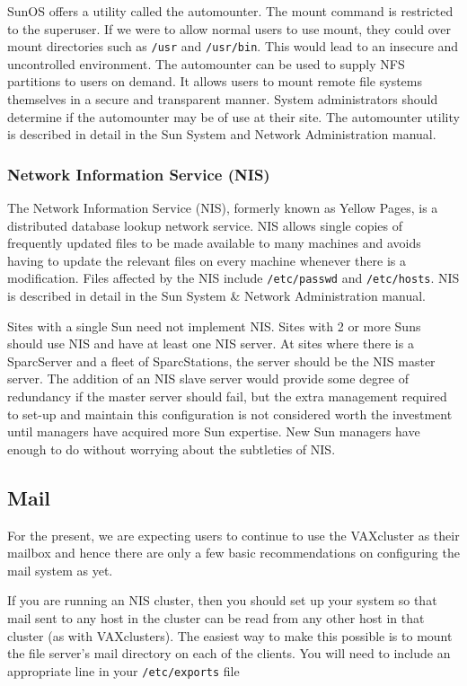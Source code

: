 SunOS offers a utility called the automounter. The mount command is restricted
to the superuser. If we were to allow normal users to use mount, they could
over mount directories such as {\tt /usr} and {\tt /usr/bin}. This would lead to an
insecure and uncontrolled environment. The automounter can be used to supply
NFS partitions to users on demand. It allows users to mount remote file
systems themselves in a secure and transparent manner. System administrators
should determine if the automounter may be of use at their site. The
automounter utility is described in detail in the Sun System and Network 
Administration manual.

\subsubsection{Network Information Service (NIS)}

The Network Information Service (NIS), formerly known as Yellow Pages, is a
distributed database lookup network service. NIS allows single copies of
frequently updated files to be made available to many machines and avoids
having to update the relevant files on every machine whenever there is a
modification. Files affected by the NIS include {\tt /etc/passwd} and 
{\tt /etc/hosts}.
NIS is described in detail in the Sun System \& Network Administration manual.

Sites with a single Sun need not implement NIS.
Sites with 2 or more Suns should use NIS and have at least one NIS server.
At sites where there is a SparcServer and a fleet of SparcStations, the 
server should be the NIS master server. The addition of an NIS slave server 
would provide some degree of redundancy if the master server 
should fail, but the extra management required to set-up and 
maintain this configuration is not considered worth the investment until
managers have acquired more Sun expertise. New Sun
managers have enough to do without worrying about the subtleties of NIS.

\subsection{Mail}

For the present, we are expecting users to continue to use the VAXcluster as
their mailbox and hence there are only a few basic recommendations on
configuring the mail system as yet. 

If you are running an NIS cluster, then you should set up your system so that 
mail sent to any host in the cluster can be read from any other host in that
cluster (as with VAXclusters). The easiest way to make this possible is to
mount the file server's mail directory on each of the clients. You will
need to include an appropriate line in your {\tt /etc/exports} file

